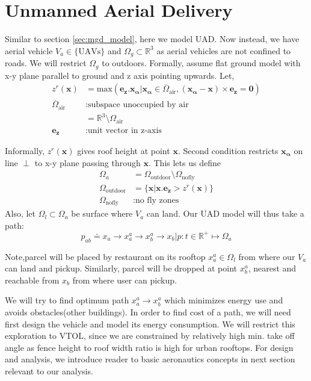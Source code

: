 \section{Unmanned Aerial Delivery}
Similar to section \ref{sec:mgd_model}, here we model UAD. Now instead, we have aerial vehicle $V_a \in \{\text{UAVs}\}$ and $\Omega_g \subset \mathbb{R}^3$ as aerial vehicles are not confined to roads. We will restrict $\Omega_g$ to outdoors. Formally,
assume flat ground model with x-y plane parallel to ground and z axis pointing upwards. Let,
\begin{align*}
    z^r(\mathbf{x}) &= \text{max} (\mathbf{e_z}.\mathbf{x_\alpha} | \mathbf{x_\alpha} \in \overline{\Omega}_{\text{air}}, (\mathbf{x_\alpha} - \mathbf{x}) \times \mathbf{e_z} = \mathbf{0} ) \\
    \overline{\Omega}_{\text{air}} &: \text{subspace unoccupied by air} \\
    &= \mathbb{R}^3 \setminus \Omega_{\text{air}} \\
    \mathbf{e_z} &: \text{unit vector in z-axis}
\end{align*}

Informally, $z^r(\mathbf{x})$ gives roof height at point $\mathbf{x}$. Second condition restricts $\mathbf{x_\alpha}$ on line $\perp$ to x-y plane passing through $\mathbf{x}$. This lets us define
\begin{align*}
    \Omega_a &= \Omega_\text{outdoor} \setminus \Omega_\text{nofly} \\
    \Omega_\text{outdoor} &= \{\mathbf{x} | \mathbf{x}.\mathbf{e_z} > z^r(\mathbf{x})\} \\
    \Omega_\text{nofly} &: \text{no fly zones}
\end{align*}
Also, let $\Omega_l \subset \Omega_a$ be surface where $V_a$ can land. Our UAD model will thus take a path:
\begin{equation*}
    p_{ab} \doteq x_a \longrightarrow x_a^a \longrightarrow x_b^a \longrightarrow x_b | p : t \in \mathbb{R}^+ \mapsto \Omega_a
\end{equation*}

Note,parcel will be placed by restaurant on its rooftop $x_a^a \in \Omega_l$ from where our $V_a$ can land and pickup. Similarly, parcel will be dropped at point $x_b^a$, nearest and reachable from $x_b$ from where user can pickup.

We will try to find optimum path $x_a^a \longrightarrow x_b^a$ which minimizes energy use and avoids obstacles(other buildings). In order to find cost of a path, we will need first design the vehicle and model its energy consumption. We will restrict this exploration to VTOL, since we are constrained by relatively high min. take off angle as fence height to roof width ratio is high for urban rooftops. For design and analysis, we introduce reader to basic aeronautics concepts in next section relevant to our analysis.